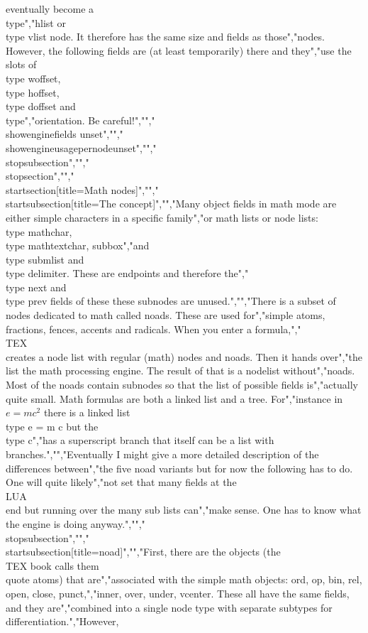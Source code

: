 eventually become a \\type","{hlist} or \\type {vlist} node. It therefore has the same size and fields as those","nodes. However, the following fields are (at least temporarily) there and they","use the slots of \\type {woffset}, \\type {hoffset}, \\type {doffset} and \\type","{orientation}. Be careful!","","\\showenginefields {unset}","","\\showengineusagepernode{unset}","","\\stopsubsection","","\\stopsection","","\\startsection[title={Math nodes}]","","\\startsubsection[title=The concept]","","Many object fields in math mode are either simple characters in a specific family","or math lists or node lists: \\type {mathchar}, \\type {mathtextchar}, {subbox}","and \\type {submlist} and \\type {delimiter}. These are endpoints and therefore the","\\type {next} and \\type {prev} fields of these these subnodes are unused.","","There is a subset of nodes dedicated to math called noads. These are used for","simple atoms, fractions, fences, accents and radicals. When you enter a formula,","\\TEX\\ creates a node list with regular (math) nodes and noads. Then it hands over","the list the math processing engine. The result of that is a nodelist without","noads. Most of the noads contain subnodes so that the list of possible fields is","actually quite small. Math formulas are both a linked list and a tree. For","instance in $e = mc^2$ there is a linked list \\type {e = m c} but the \\type {c}","has a superscript branch that itself can be a list with branches.","","Eventually I might give a more detailed description of the differences between","the five noad variants but for now the following has to do. One will quite likely","not set that many fields at the \\LUA\\ end but running over the many sub lists can","make sense. One has to know what the engine is doing anyway.","","\\stopsubsection","","\\startsubsection[title=noad]","","First, there are the objects (the \\TEX book calls them \\quote {atoms}) that are","associated with the simple math objects: ord, op, bin, rel, open, close, punct,","inner, over, under, vcenter. These all have the same fields, and they are","combined into a single node type with separate subtypes for differentiation.","However, 